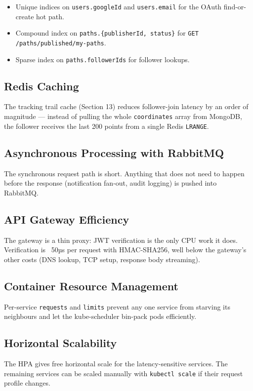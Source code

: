 \documentclass[11pt,a4paper]{article}
\begin{document}
\begin{itemize}[leftmargin=*]
  \item Unique indices on \texttt{users.googleId} and
        \texttt{users.email} for the OAuth find-or-create hot path.
  \item Compound index on \texttt{paths.\{publisherId, status\}} for
        \texttt{GET /paths/published/my-paths}.
  \item Sparse index on \texttt{paths.followerIds} for follower
        lookups.
\end{itemize}

\subsection{Redis Caching}
The tracking trail cache (Section 13) reduces follower-join latency
by an order of magnitude — instead of pulling the whole
\texttt{coordinates} array from MongoDB, the follower receives the
last 200 points from a single Redis \texttt{LRANGE}.

\subsection{Asynchronous Processing with RabbitMQ}
The synchronous request path is short.  Anything that does not need
to happen before the response (notification fan-out, audit logging)
is pushed into RabbitMQ.

\subsection{API Gateway Efficiency}
The gateway is a thin proxy: JWT verification is the only CPU work
it does.  Verification is ~50µs per request with HMAC-SHA256, well
below the gateway's other costs (DNS lookup, TCP setup, response
body streaming).

\subsection{Container Resource Management}
Per-service \texttt{requests} and \texttt{limits} prevent any one
service from starving its neighbours and let the kube-scheduler
bin-pack pods efficiently.

\subsection{Horizontal Scalability}
The HPA gives free horizontal scale for the latency-sensitive
services.  The remaining services can be scaled manually with
\texttt{kubectl scale} if their request profile changes.
\end{document}

